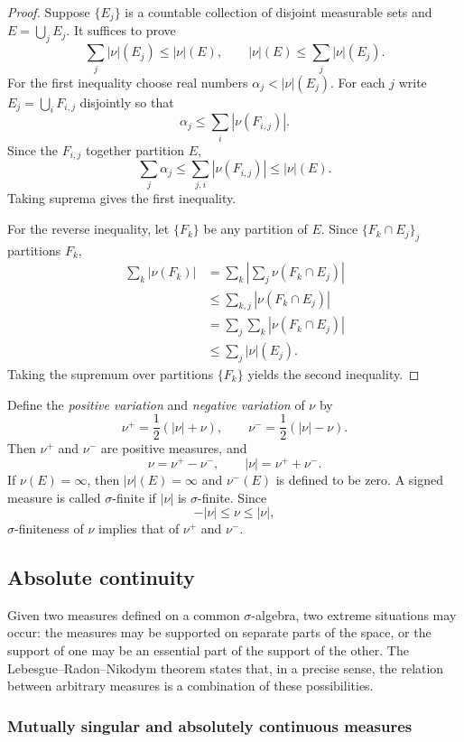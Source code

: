 \documentclass[11pt,openany]{book}
\begin{document}
\begin{proof}
Suppose $\{E_j\}$ is a countable collection of disjoint measurable sets and $E=\bigcup_jE_j$. It suffices to prove
\begin{equation}
\sum_j|\nu|(E_j)\leq|\nu|(E),
\qquad
|\nu|(E)\leq\sum_j|\nu|(E_j).
\tag{11}
\end{equation}
For the first inequality choose real numbers $\alpha_j<|\nu|(E_j)$. For each $j$ write $E_j=\bigcup_iF_{i,j}$ disjointly so that
\[
\alpha_j\leq\sum_i|\nu(F_{i,j})|.
\]
Since the $F_{i,j}$ together partition $E$,
\[
\sum_j\alpha_j\leq\sum_{j,i}|\nu(F_{i,j})|\leq|\nu|(E).
\]
Taking suprema gives the first inequality.

For the reverse inequality, let $\{F_k\}$ be any partition of $E$. Since $\{F_k\cap E_j\}_j$ partitions $F_k$,
\begin{align*}
\sum_k|\nu(F_k)|
&=\sum_k\left|\sum_j\nu(F_k\cap E_j)\right|\\
&\leq\sum_{k,j}|\nu(F_k\cap E_j)|\\
&=\sum_j\sum_k|\nu(F_k\cap E_j)|\\
&\leq\sum_j|\nu|(E_j).
\end{align*}
Taking the supremum over partitions $\{F_k\}$ yields the second inequality.
\end{proof}

Define the \emph{positive variation} and \emph{negative variation} of $\nu$ by
\[
\nu^+=\frac12(|\nu|+\nu),
\qquad
\nu^-=\frac12(|\nu|-\nu).
\]
Then $\nu^+$ and $\nu^-$ are positive measures, and
\[
\nu=\nu^+-\nu^- ,
\qquad
|\nu|=\nu^++\nu^-.
\]
If $\nu(E)=\infty$, then $|\nu|(E)=\infty$ and $\nu^-(E)$ is defined to be zero. A signed measure is called $\sigma$-finite if $|\nu|$ is $\sigma$-finite. Since
\[
-|\nu|\leq\nu\leq|\nu|,
\]
$\sigma$-finiteness of $\nu$ implies that of $\nu^+$ and $\nu^-$.

\subsection{Absolute continuity}

Given two measures defined on a common $\sigma$-algebra, two extreme situations may occur: the measures may be supported on separate parts of the space, or the support of one may be an essential part of the support of the other. The Lebesgue--Radon--Nikodym theorem states that, in a precise sense, the relation between arbitrary measures is a combination of these possibilities.

\subsubsection*{Mutually singular and absolutely continuous measures}
\end{document}

